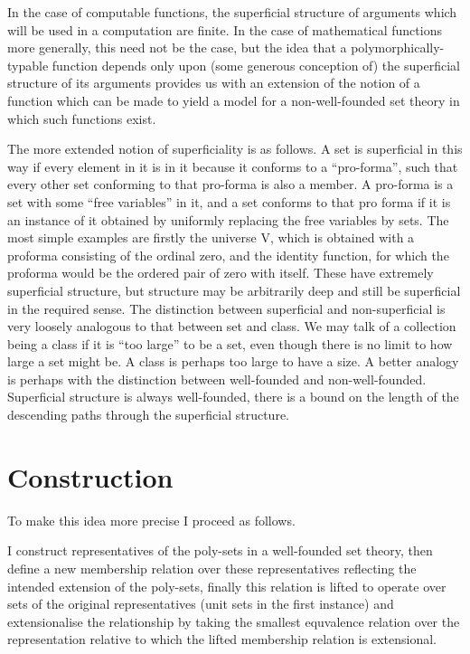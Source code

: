 \documentclass[numreferences]{rbjk}
\begin{document}
\begin{article}
In the case of computable functions, the superficial structure of arguments which will be used in a computation are finite.
In the case of mathematical functions more generally, this need not be the case, but the idea that a polymorphically-typable function depends only upon (some generous conception of) the superficial structure of its arguments provides us with an extension of the notion of a function which can be made to yield a model for a non-well-founded set theory in which such functions exist.

The more extended notion of superficiality is as follows.
A set is superficial in this way if every element in it is in it because it conforms to a ``pro-forma'', such that every other set conforming to that pro-forma is also a member.
A pro-forma is a set with some ``free variables'' in it, and a set conforms to that pro forma if it is an instance of it obtained by uniformly replacing the free variables by sets.
The most simple examples are firstly the universe V, which is obtained with a proforma consisting of the ordinal zero, and the identity function, for which the proforma would be the ordered pair of zero with itself.
These have extremely superficial structure, but structure may be arbitrarily deep and still be superficial in the required sense.
The distinction between superficial and non-superficial is very loosely analogous to that between set and class.
We may talk of a collection being a class if it is ``too large'' to be a set, even though there is no limit to how large a set might be.
A class is perhaps too large to have a size.
A better analogy is perhaps with the distinction between well-founded and non-well-founded.
Superficial structure is always well-founded, there is a bound on the length of the descending paths through the superficial structure.

\section{Construction}
To make this idea more precise I proceed as follows.

I construct representatives of the poly-sets in a well-founded set theory, then define a new membership relation over these representatives reflecting the intended extension of the poly-sets, finally this relation is lifted to operate over sets of the original representatives (unit sets in the first instance) and extensionalise the relationship by taking the smallest equvalence relation over the representation relative to which the lifted membership relation is extensional.


\end{article}
\end{document}
